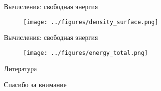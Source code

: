 \documentclass[aspectratio=169]{beamer}
\begin{document}
\begin{frame}{Вычисления: свободная энергия}
\vspace{-0.8cm}
\begin{figure}
	\texttt{[image: ../figures/density\_surface.png]}
\end{figure}
\end{frame}


\begin{frame}{Вычисления: свободная энергия}
\vspace{-0.8cm}
\begin{figure}
	\texttt{[image: ../figures/energy\_total.png]}
\end{figure}
\end{frame}


\begin{frame}{Литература}
\printbibliography
\end{frame}


\begin{frame}{}
\begin{center}
	\Large
	Спасибо за внимание
\end{center}
\end{frame}
\end{document}
